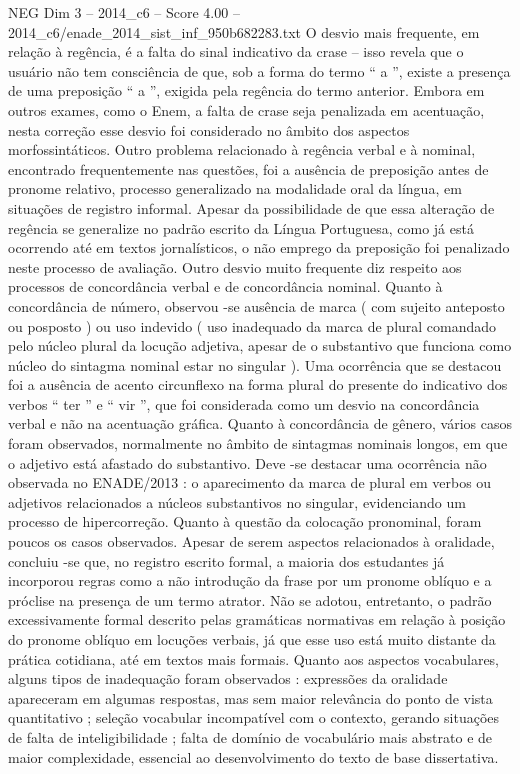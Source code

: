 \begin{textsample}{NEG Dim 3 – 2014\_c6 – Score 4.00 – 2014\_c6/enade\_2014\_sist\_inf\_950b682283.txt}
O desvio mais frequente, em relação à regência, é a falta do sinal indicativo da crase – isso revela que o usuário não tem consciência de que, sob a forma do termo “ a ”, existe a presença de uma preposição “ a ”, exigida pela regência do termo anterior.
Embora em outros exames, como o Enem, a falta de crase seja penalizada em acentuação, nesta correção esse desvio foi considerado no âmbito dos aspectos morfossintáticos.
Outro problema relacionado à regência verbal e à nominal, encontrado frequentemente nas questões, foi a ausência de preposição antes de pronome relativo, processo generalizado na modalidade oral da língua, em situações de registro informal.
Apesar da possibilidade de que essa alteração de regência se generalize no padrão escrito da Língua Portuguesa, como já está ocorrendo até em textos jornalísticos, o não emprego da preposição foi penalizado neste processo de avaliação.
Outro desvio muito frequente diz respeito aos processos de concordância verbal e de concordância nominal.
Quanto à concordância de número, observou -se ausência de marca ( com sujeito anteposto ou posposto ) ou uso indevido ( uso inadequado da marca de plural comandado pelo núcleo plural da locução adjetiva, apesar de o substantivo que funciona como núcleo do sintagma nominal estar no singular ).
Uma ocorrência que se destacou foi a ausência de acento circunflexo na forma plural do presente do indicativo dos verbos “ ter ” e “ vir ”, que foi considerada como um desvio na concordância verbal e não na acentuação gráfica.
Quanto à concordância de gênero, vários casos foram observados, normalmente no âmbito de sintagmas nominais longos, em que o adjetivo está afastado do substantivo.
Deve -se destacar uma ocorrência não observada no ENADE/2013 : o aparecimento da marca de plural em verbos ou adjetivos relacionados a núcleos substantivos no singular, evidenciando um processo de hipercorreção.
Quanto à questão da colocação pronominal, foram poucos os casos observados.
Apesar de serem aspectos relacionados à oralidade, concluiu -se que, no registro escrito formal, a maioria dos estudantes já incorporou regras como a não introdução da frase por um pronome oblíquo e a próclise na presença de um termo atrator.
Não se adotou, entretanto, o padrão excessivamente formal descrito pelas gramáticas normativas em relação à posição do pronome oblíquo em locuções verbais, já que esse uso está muito distante da prática cotidiana, até em textos mais formais.
Quanto aos aspectos vocabulares, alguns tipos de inadequação foram observados : expressões da oralidade apareceram em algumas respostas, mas sem maior relevância do ponto de vista quantitativo ; seleção vocabular incompatível com o contexto, gerando situações de falta de inteligibilidade ; falta de domínio de vocabulário mais abstrato e de maior complexidade, essencial ao desenvolvimento do texto de base dissertativa.

\end{textsample}
